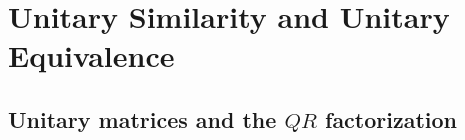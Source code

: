 \section{Unitary Similarity and Unitary Equivalence}

\subsection{Unitary matrices and the $QR$ factorization}

  

